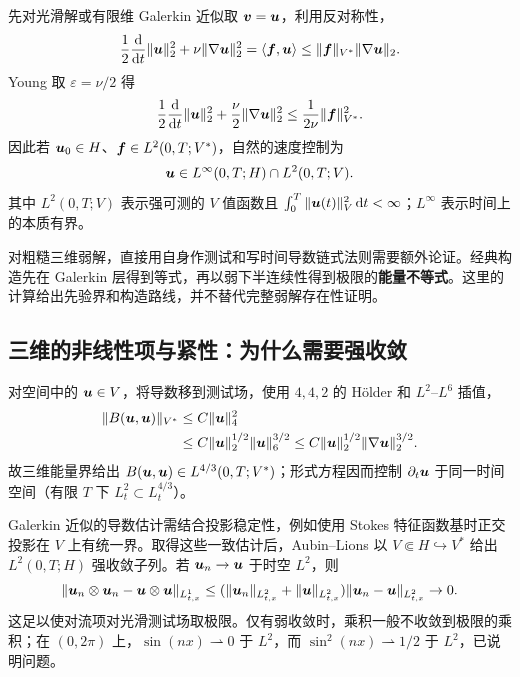 先对光滑解或有限维 Galerkin 近似取 $\bm{v}=\bm{u}$，利用反对称性，
\[
 \frac12\frac{\mathrm d}{\mathrm dt}\|\bm{u}\|_2^2
 +\nu\|\nabla\bm{u}\|_2^2
 =\langle\bm{f},\bm{u}\rangle
 \le\|\bm{f}\|_{V^*}\|\nabla\bm{u}\|_2.
\]
Young 取 $\varepsilon=\nu/2$ 得
\begin{equation}
 \frac12\frac{\mathrm d}{\mathrm dt}\|\bm{u}\|_2^2
 +\frac\nu2\|\nabla\bm{u}\|_2^2
 \le\frac1{2\nu}\|\bm{f}\|_{V^*}^2.
 \label{eq:sobolev-ns-energy}
\end{equation}
因此若 $\bm{u}_0\in H$、$\bm{f}\in L^2(0,T;V^*)$，自然的速度控制为
\begin{equation}
 \bm{u}\in L^\infty(0,T;H)\cap L^2(0,T;V).
 \label{eq:sobolev-energy-space}
\end{equation}
其中 $L^2(0,T;V)$ 表示强可测的 $V$ 值函数且 $\int_0^T\|\bm{u}(t)\|_V^2\,\mathrm d t<\infty$；$L^\infty$ 表示时间上的本质有界。

对粗糙三维弱解，直接用自身作测试和写时间导数链式法则需要额外论证。经典构造先在 Galerkin 层得到等式，再以弱下半连续性得到极限的\textbf{能量不等式}。这里的计算给出先验界和构造路线，并不替代完整弱解存在性证明。

\subsection{三维的非线性项与紧性：为什么需要强收敛}

对空间中的 $\bm{u}\in V$，将导数移到测试场，使用 $4,4,2$ 的 H\"older 和 $L^2$--$L^6$ 插值，
\begin{align*}
 \|B(\bm{u},\bm{u})\|_{V^*}
 &\le C\|\bm{u}\|_4^2\\
 &\le C\|\bm{u}\|_2^{1/2}\|\bm{u}\|_6^{3/2}
 \le C\|\bm{u}\|_2^{1/2}\|\nabla\bm{u}\|_2^{3/2}.
\end{align*}
故三维能量界给出 $B(\bm{u},\bm{u})\in L^{4/3}(0,T;V^*)$；形式方程因而控制 $\partial_t\bm{u}$ 于同一时间空间（有限 $T$ 下 $L^2_t\subset L^{4/3}_t$）。

Galerkin 近似的导数估计需结合投影稳定性，例如使用 Stokes 特征函数基时正交投影在 $V$ 上有统一界。取得这些一致估计后，Aubin--Lions 以 $V\Subset H\hookrightarrow V^*$ 给出 $L^2(0,T;H)$ 强收敛子列。若 $\bm{u}_n\to\bm{u}$ 于时空 $L^2$，则
\[
 \|\bm{u}_n\otimes\bm{u}_n-\bm{u}\otimes\bm{u}\|_{L^1_{t,x}}
 \le(\|\bm{u}_n\|_{L^2_{t,x}}+\|\bm{u}\|_{L^2_{t,x}})
       \|\bm{u}_n-\bm{u}\|_{L^2_{t,x}}\to0.
\]
这足以使对流项对光滑测试场取极限。仅有弱收敛时，乘积一般不收敛到极限的乘积；在 $(0,2\pi)$ 上，$\sin(nx)\rightharpoonup0$ 于 $L^2$，而 $\sin^2(nx)\rightharpoonup1/2$ 于 $L^2$，已说明问题。

